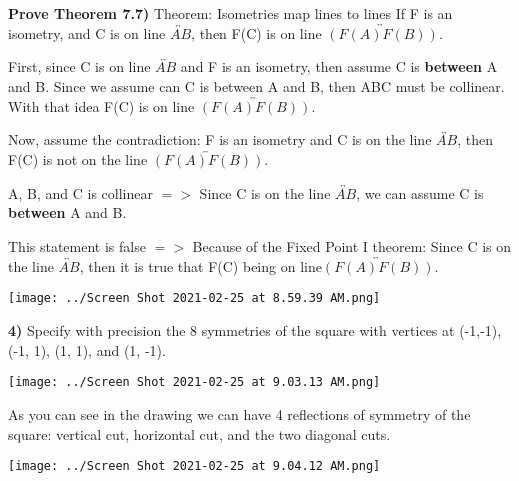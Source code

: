 \documentclass{article}
\begin{document}
\newpage
\textbf{Prove Theorem 7.7)} Theorem: Isometries map lines to lines
If F is an isometry, and C is on line $\overleftrightarrow{AB}$, then F(C) is on line $\overleftrightarrow{(F(A)F(B))}$.

\vspace{2mm}

First, since C is on line $\overleftrightarrow{AB}$ and F is an isometry, then assume C is \textbf{between} A and B. Since we assume can C is between A and B, then ABC must be collinear. With that idea F(C) is on line $\overleftrightarrow{(F(A)F(B))}$.

\vspace{2mm}

Now, assume the contradiction: F is an isometry and C is on the line $\overleftrightarrow{AB}$, then F(C) is not on the line $\overleftrightarrow{(F(A)F(B))}$.

\vspace{2mm}


A, B, and C is collinear $=>$ Since C is on the line $\overleftrightarrow{AB}$, we  can assume C is \textbf{between} A and B.

\vspace{2mm}

This statement is false $=>$ Because of the Fixed Point I theorem: Since C is on the line $\overleftrightarrow{AB}$, then it is true that F(C) being on line$\overleftrightarrow{(F(A)F(B))}$.

\vspace{2mm}


\texttt{[image: ../Screen Shot 2021-02-25 at 8.59.39 AM.png]} 



\newpage

\textbf{4)} Specify with precision the 8 symmetries of the square with vertices at (-1,-1), (-1, 1), (1, 1), and (1, -1). 

\vspace{5mm}

\texttt{[image: ../Screen Shot 2021-02-25 at 9.03.13 AM.png]} 

As you can see in the drawing we can have 4 reflections of symmetry of the square: vertical cut, horizontal cut, and the two diagonal cuts.

\vspace{5mm}

\texttt{[image: ../Screen Shot 2021-02-25 at 9.04.12 AM.png]} 
\end{document}
